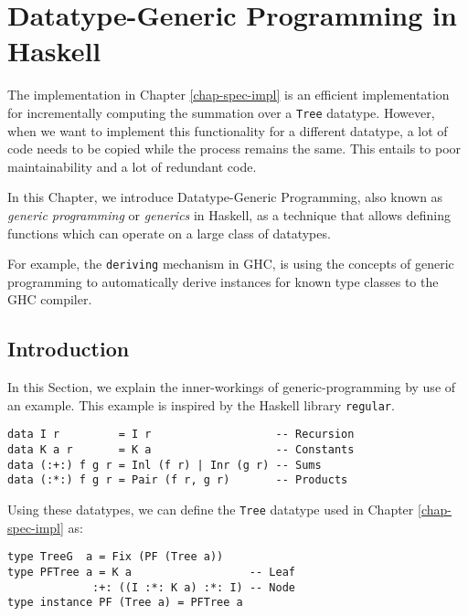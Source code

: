 \chapter{Datatype-Generic Programming in Haskell}

The implementation in Chapter \ref{chap-spec-impl} is an efficient implementation for incrementally computing the summation over a \texttt{Tree} datatype. However, when we want to implement this functionality for a different datatype, a lot of code needs to be copied while the process remains the same. This entails to poor maintainability and a lot of redundant code.

In this Chapter, we introduce Datatype-Generic Programming, also known as \textit{generic programming} or \textit{generics} in Haskell, as a technique that allows defining functions which can operate on a large class of datatypes. 


For example, the \texttt{deriving} mechanism in GHC, is using the concepts of generic programming to automatically derive instances for known type classes to the GHC compiler. 

\section{Introduction}
In this Section, we explain the inner-workings of generic-programming by use of an example. This example is inspired by the Haskell library \texttt{regular}.
\begin{verbatim}
data I r         = I r                   -- Recursion
data K a r       = K a                   -- Constants
data (:+:) f g r = Inl (f r) | Inr (g r) -- Sums
data (:*:) f g r = Pair (f r, g r)       -- Products
\end{verbatim}

Using these datatypes, we can define the \texttt{Tree} datatype used in Chapter \ref{chap-spec-impl} as:

\begin{verbatim}
type TreeG  a = Fix (PF (Tree a))
type PFTree a = K a                  -- Leaf
             :+: ((I :*: K a) :*: I) -- Node
type instance PF (Tree a) = PFTree a
\end{verbatim}

